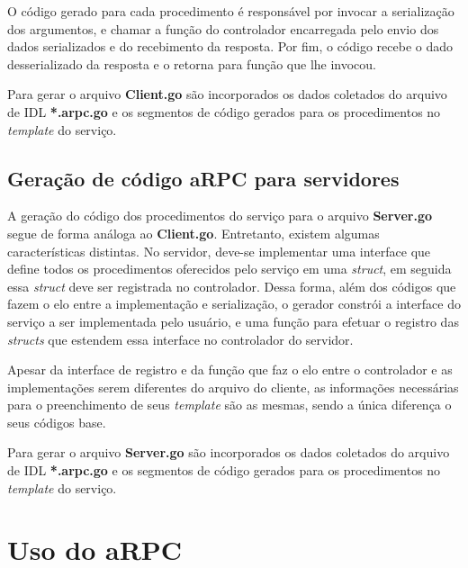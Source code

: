 O código gerado para cada procedimento é responsável por invocar a serialização dos argumentos, e chamar a função do controlador encarregada pelo envio dos dados serializados e do recebimento da resposta. Por fim, o código recebe o dado desserializado da resposta e o retorna para função que lhe invocou.

Para gerar o arquivo \textbf{Client.go} são incorporados os dados coletados do arquivo de IDL \textbf{*.arpc.go} e os segmentos de código gerados para os procedimentos no \textit{template} do serviço.

\subsection{Geração de código aRPC para servidores}

A geração do código dos procedimentos do serviço para o arquivo \textbf{Server.go} segue de forma análoga ao \textbf{Client.go}. Entretanto, existem algumas características distintas. No servidor, deve-se implementar uma interface que define todos os procedimentos oferecidos pelo serviço em uma \textit{struct}, em seguida essa \textit{struct} deve ser registrada no controlador. Dessa forma, além dos códigos que fazem o elo entre a implementação e serialização, o gerador constrói a interface do serviço a ser implementada pelo usuário, e uma função para efetuar o registro das \textit{structs} que estendem essa interface no controlador do servidor.

Apesar da interface de registro e da função que faz o elo entre o controlador e as implementações serem diferentes do arquivo do cliente, as informações necessárias para o preenchimento de seus \textit{template} são as mesmas, sendo a única diferença o seus códigos base.

Para gerar o arquivo \textbf{Server.go} são incorporados os dados coletados do arquivo de IDL \textbf{*.arpc.go} e os segmentos de código gerados para os procedimentos no \textit{template} do serviço.

\section{Uso do aRPC}

